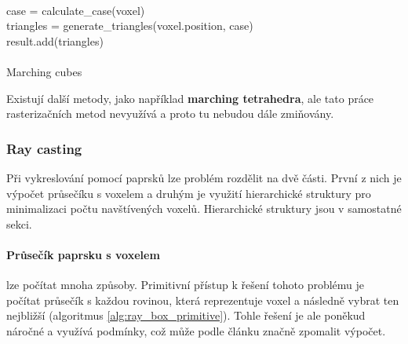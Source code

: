 \begin{center}
	\begin{czechalgorithm}[H] \label{alg:marching_cubes}
		 {\\
			case = calculate\_case(voxel)\\
			triangles = generate\_triangles(voxel.position, case)\\
			result.add(triangles)\\
		}\\
		\caption{Marching cubes}
	\end{czechalgorithm}
\end{center}

Existují další metody, jako například \textbf{marching tetrahedra}, ale tato práce rasterizačních metod nevyužívá a proto tu nebudou dále zmiňovány.

\subsubsection{Ray casting} \label{sec:voxel_intersection}
Při vykreslování pomocí paprsků lze problém rozdělit na dvě části. První z nich je výpočet průsečíku s voxelem a druhým je využití hierarchické struktury pro minimalizaci počtu navštívených voxelů. Hierarchické struktury jsou v samostatné sekci.

\paragraph{Průsečík paprsku s voxelem} lze počítat mnoha způsoby. Primitivní přístup k řešení tohoto problému je počítat průsečík s každou rovinou, která reprezentuje voxel a následně vybrat ten nejbližší (algoritmus \ref{alg:ray_box_primitive}). Tohle řešení je ale poněkud náročné a využívá podmínky, což může podle článku \cite{gpu_branch} značně zpomalit výpočet.

